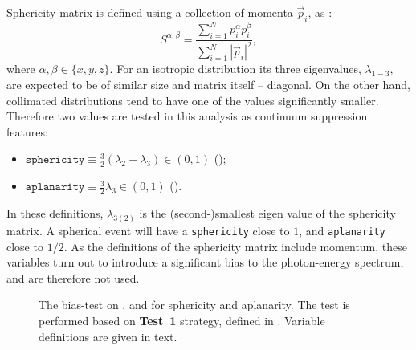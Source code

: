 Sphericity matrix is defined using a collection of momenta $\vec{p}_i$, as \cite{BaBar:2014omp}:
\begin{equation}
    S^{\alpha,\beta} = \frac{\sum^N_{i=1}p_i^{\alpha}p_i^{\beta}}{\sum^N_{i=1}|\vec{p}_i|^2},
\end{equation}
where $\alpha,\beta\in\{x,y,z\}$.
For an isotropic distribution its three eigenvalues, $\lambda_{1-3}$, are expected to be of similar size and matrix itself -- diagonal.
On the other hand, collimated distributions tend to have one of the values significantly smaller.
Therefore two values are tested in this analysis as continuum suppression features:
\begin{itemize}
    \item $\mathtt{sphericity}\equiv\frac{3}{2}(\lambda_2+\lambda_3)\in(0,1)$ ();
    \item $\mathtt{aplanarity}\equiv\frac{3}{2}\lambda_3\in(0,1)$ ().
\end{itemize}
In these definitions, $\lambda_{3(2)}$ is the (second-)smallest eigen value of the sphericity matrix.
A spherical event will have a \texttt{sphericity} close to $1$, and \texttt{aplanarity} close to $1/2$.
As the definitions of the sphericity matrix include momentum, these variables turn out to introduce a significant bias to the photon-energy spectrum, and are therefore not used.

\begin{figure}[htbp!]
    \caption{\label{fig:sphericity_aplanarity} The bias-test on \EB, \Estar and \Mbc for sphericity and aplanarity.
    The test is performed based on \textbf{Test~1} strategy, defined in .
    Variable definitions are given in text.}
\end{figure}